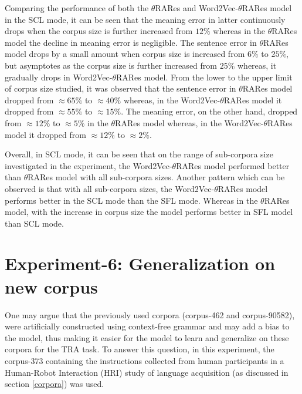 Comparing the performance of both the $\theta$RARes and Word2Vec-$\theta$RARes model in the SCL mode, it can be seen that the meaning error in latter continuously drops when the corpus size is further increased from $12 \%$ whereas in the $\theta$RARes model the decline in meaning error is negligible. The sentence error in $\theta$RARes model drops by a small amount when corpus size is increased from $6 \% $ to $25 \%$, but asymptotes as the corpus size is further increased from $25\%$ whereas, it gradually drops in Word2Vec-$\theta$RARes model. From the lower to the upper limit of corpus size studied, it was observed that the sentence error in $\theta$RARes model dropped from $\approx 65\%$ to $\approx 40\%$ whereas, in the Word2Vec-$\theta$RARes model it dropped from $\approx 55\%$ to $\approx 15 \% $. The meaning error, on the other hand, dropped from $\approx 12\%$ to $\approx 5\%$ in the $\theta$RARes model whereas, in the Word2Vec-$\theta$RARes model it dropped from $\approx 12\%$ to $\approx 2\%$.

Overall, in SCL mode, it can be seen that on the range of sub-corpora size investigated in the experiment, the Word2Vec-$\theta$RARes model performed better than $\theta$RARes model with all sub-corpora sizes. Another pattern which can be observed is that with all sub-corpora sizes, the Word2Vec-$\theta$RARes model performs better in the SCL mode than the SFL mode. Whereas in the $\theta$RARes model, with the increase in corpus size the model performs better in SFL model than SCL mode. 

\section{Experiment-6: Generalization on new corpus}

One may argue that the previously used corpora (corpus-462 and corpus-90582), were artificially constructed using context-free grammar and may add a bias to the model, thus making it easier for the model to learn and generalize on these corpora for the TRA task. To answer this question, in this experiment, the corpus-373 containing the instructions collected from human participants in a Human-Robot Interaction (HRI) study of language acquisition (as discussed in section \ref{corpora}) was used.

